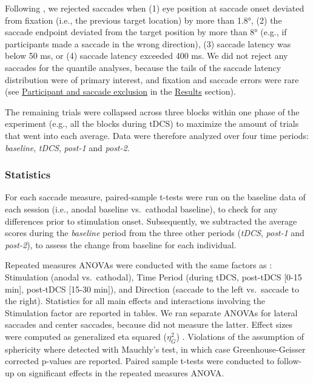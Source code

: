 \documentclass[11pt,english,]{memoir}
\begin{document}
Following \textcite{Kanai2012}, we rejected saccades when (1) eye position at saccade onset deviated from fixation (i.e., the previous target location) by more than 1.8°, (2) the saccade endpoint deviated from the target position by more than 8° (e.g., if participants made a saccade in the wrong direction), (3) saccade latency was below 50 ms, or (4) saccade latency exceeded 400 ms. We did not reject any saccades for the quantile analyses, because the tails of the saccade latency distribution were of primary interest, and fixation and saccade errors were rare (see \protect\hyperlink{participant-and-saccade-exclusion}{Participant and saccade exclusion} in the \protect\hyperlink{sacc_tDCS-results}{Results} section).

The remaining trials were collapsed across three blocks within one phase of the experiment (e.g., all the blocks during tDCS) to maximize the amount of trials that went into each average. Data were therefore analyzed over four time periods: \emph{baseline}, \emph{tDCS}, \emph{post-1} and \emph{post-2}.

\hypertarget{statistics}{%
\subsubsection{Statistics}\label{statistics}}

For each saccade measure, paired-sample t-tests were run on the baseline data of each session (i.e., anodal baseline vs.~cathodal baseline), to check for any differences prior to stimulation onset. Subsequently, we subtracted the average scores during the \emph{baseline} period from the three other periods (\emph{tDCS}, \emph{post-1} and \emph{post-2}), to assess the change from baseline for each individual.

Repeated measures ANOVAs were conducted \autocite{R-ez} with the same factors as \textcite{Kanai2012}: Stimulation (anodal vs.~cathodal), Time Period (during tDCS, post-tDCS {[}0-15 min{]}, post-tDCS {[}15-30 min{]}), and Direction (saccade to the left vs.~saccade to the right). Statistics for all main effects and interactions involving the Stimulation factor are reported in tables. We ran separate ANOVAs for lateral saccades and center saccades, because \textcite{Kanai2012} did not measure the latter. Effect sizes were computed as generalized eta squared (\(\eta_{G}^{2}\)) \autocite{Bakeman2005}. Violations of the assumption of sphericity where detected with Mauchly's test, in which case Greenhouse-Geisser corrected p-values are reported. Paired sample t-tests were conducted to follow-up on significant effects in the repeated measures ANOVA.
\end{document}
